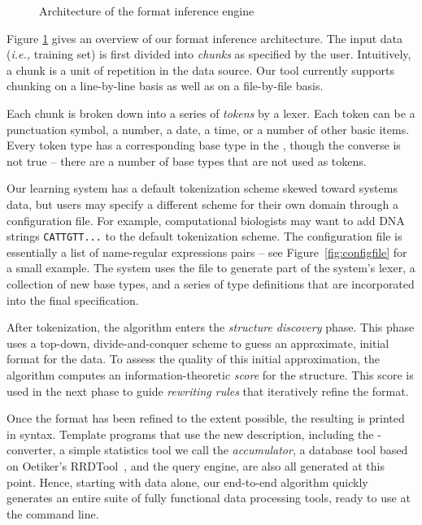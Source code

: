 
\begin{figure}
\begin{center}
\caption{Architecture of the format inference engine}
\vspace*{-5mm}
\label{fig-archi}
\end{center}
\end{figure}

Figure \ref{fig-archi} gives an overview of our format inference
architecture. The input data ({\em i.e.,} training set) is first
divided into {\em chunks} as specified by the user.  Intuitively, a chunk
is a unit of repetition in the data source.  Our tool currently supports
chunking on a line-by-line basis as well as on a file-by-file basis.  

Each chunk is broken down into a
series of {\em tokens} by a lexer.
Each token can be a punctuation symbol, a
number, a date, a time, or a number of other basic items.  Every token
type has a corresponding base type in the \ir{}, though the 
converse is not true -- there are
a number of base types that are not used as tokens.

Our learning system has a default tokenization scheme skewed toward systems
data, but users may specify a different scheme for their own domain
through a configuration file.  For example, computational biologists
may want to add DNA strings {\tt CATTGTT...} to the default tokenization 
scheme.  The configuration file is essentially
a list of name-regular expressions pairs -- see Figure~\ref{fig:configfile}
for a small example.  The system uses the file to generate 
part of the system's lexer, a
collection of new \ir{} base types, and a series of type 
definitions that are incorporated into the final \pads{} specification.  

After tokenization, the algorithm enters the {\em structure discovery} 
phase.  This phase uses a top-down, divide-and-conquer
scheme to guess an approximate, initial format for the data.
To assess the quality of this initial approximation, the
algorithm computes an information-theoretic {\em score} for the
structure.  This score is used in the next phase to guide
{\em rewriting rules} that iteratively refine the format.  

Once the format has been refined to the extent possible, the resulting
\ir{} is printed in \pads{} syntax.  Template programs that use the
new description, including the \xml{}-converter, a simple
statistics tool we call the {\em accumulator}, a database tool
based on Oetiker's RRDTool~\cite{rrdtool}, and the \padx{}
query engine, are also all generated at this point.  Hence, starting
with data alone, our end-to-end algorithm quickly generates an entire suite
of fully functional data processing tools, ready to use at the command line.

